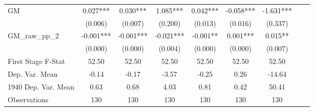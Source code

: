 \begin{tabular}{l*{8}{c}}
GM              &    0.027***&    0.030***&    1.085***&    0.042***&   -0.058***&   -1.631***\\
                &  (0.006)   &  (0.007)   &  (0.200)   &  (0.013)   &  (0.016)   &  (0.337)   \\
\addlinespace
GM\_raw\_pp\_2     &   -0.001***&   -0.001***&   -0.021***&   -0.001** &    0.001***&    0.015** \\
                &  (0.000)   &  (0.000)   &  (0.004)   &  (0.000)   &  (0.000)   &  (0.007)   \\
\midrule
First Stage F-Stat&    52.50   &    52.50   &    52.50   &    52.50   &    52.50   &    52.50   \\
Dep. Var. Mean  &    -0.14   &    -0.17   &    -3.57   &    -0.25   &     0.26   &   -14.64   \\
1940 Dep. Var. Mean&     0.63   &     0.68   &     4.03   &     0.81   &     0.42   &    50.41   \\
Observations    &      130   &      130   &      130   &      130   &      130   &      130   \\
       \bottomrule \end{tabular}
